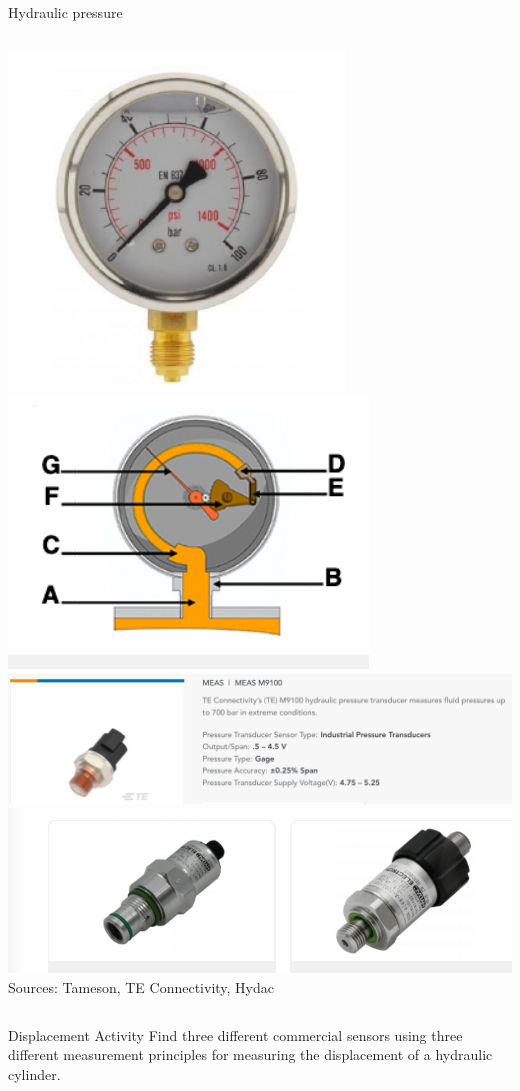 \documentclass[presentation,aspectratio=169]{beamer}
\begin{document}
\begin{frame}[label={sec:orgb605a39}]{Hydraulic pressure}
\begin{columns}
\begin{column}{0.7\columnwidth}
\pause
\begin{center}
\includegraphics[width=0.3\linewidth]{../../figures/gauge.png}
\includegraphics[width=0.3\linewidth]{../../figures/gauge-principle.png}
\includegraphics[width=0.7\linewidth]{../../figures/pressure-transducer.png}\\
\includegraphics[width=0.45\linewidth]{../../figures/hydac.png}\\
{\tiny Sources: Tameson, TE Connectivity, Hydac}
\end{center}
\end{column}
\end{columns}
\end{frame}

\begin{frame}[label={sec:orgd1ebd0c}]{Displacement}
\alert{Activity} Find three different commercial sensors using three different measurement principles for measuring the displacement of a hydraulic cylinder. 
\end{frame}
\end{document}
